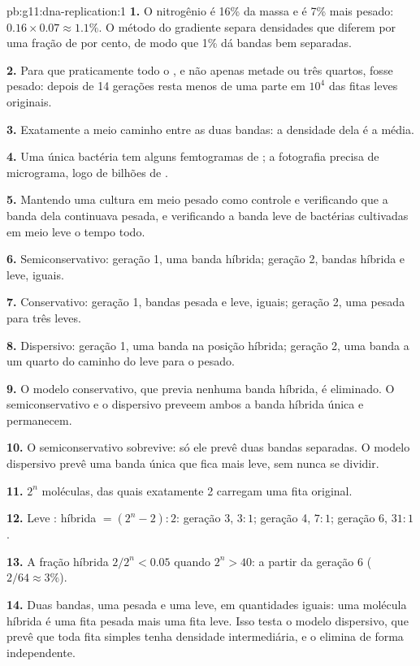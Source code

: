 \begin{solution}{pb:g11:dna-replication:1}
\textbf{1.} O nitrogênio é 16\% da massa e é 7\% mais pesado:
$0.16 \times 0.07 \approx 1.1\%$. O método do gradiente separa
densidades que diferem por uma fração de por cento, de modo que 1\% dá
bandas bem separadas.

\textbf{2.} Para que praticamente todo o , e não apenas metade ou
três quartos, fosse pesado: depois de 14 gerações resta menos de uma
parte em $10^4$ das fitas leves originais.

\textbf{3.} Exatamente a meio caminho entre as duas bandas: a densidade
dela é a média.

\textbf{4.} Uma única bactéria tem alguns femtogramas de ; a
fotografia precisa de micrograma, logo de bilhões de .

\textbf{5.} Mantendo uma cultura em meio pesado como controle e
verificando que a banda dela continuava pesada, e verificando a banda
leve de bactérias cultivadas em meio leve o tempo todo.

\textbf{6.} Semiconservativo: geração 1, uma banda híbrida; geração 2,
bandas híbrida e leve, iguais.

\textbf{7.} Conservativo: geração 1, bandas pesada e leve, iguais;
geração 2, uma pesada para três leves.

\textbf{8.} Dispersivo: geração 1, uma banda na posição híbrida;
geração 2, uma banda a um quarto do caminho do leve para o pesado.

\textbf{9.} O modelo conservativo, que previa nenhuma banda híbrida, é
eliminado. O semiconservativo e o dispersivo preveem ambos a banda
híbrida única e permanecem.

\textbf{10.} O semiconservativo sobrevive: só ele prevê duas bandas
separadas. O modelo dispersivo prevê uma banda única que fica mais
leve, sem nunca se dividir.

\textbf{11.} $2^n$ moléculas, das quais exatamente 2 carregam uma fita
original.

\textbf{12.} Leve : híbrida $= (2^n - 2) : 2$: geração 3, $3:1$;
geração 4, $7:1$; geração 6, $31:1$.

\textbf{13.} A fração híbrida $2/2^n < 0.05$ quando $2^n > 40$: a
partir da geração 6 ($2/64 \approx 3\%$).

\textbf{14.} Duas bandas, uma pesada e uma leve, em quantidades iguais:
uma molécula híbrida é uma fita pesada mais uma fita leve. Isso testa o
modelo dispersivo, que prevê que toda fita simples tenha densidade
intermediária, e o elimina de forma independente.


\end{solution}
